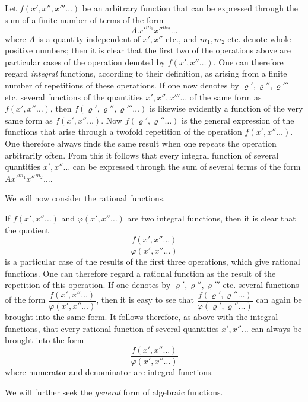 \documentclass{article}
\begin{document}
Let $f(x', x'', x''' \ldots)$ be an arbitrary function that can be expressed through the sum of a finite number of terms of the form
\[ A\,x'^{m_1} x''^{m_2} \ldots \]
where $A$ is a quantity independent of $x', x''$ etc., and $m_1, m_2$ etc. denote whole positive numbers; then it is clear that the first two of the operations above are particular cases of the operation denoted by $f(x', x'' \ldots)$. One can therefore regard \emph{integral} functions, according to their definition, as arising from a finite number of repetitions of these operations. If one now denotes by $\varrho', \varrho'', \varrho''' $ etc. several functions of the quantities $x', x'', x''' \ldots$ of the same form as $f(x', x'' \ldots)$, then $f(\varrho', \varrho'', \varrho''' \ldots)$ is likewise evidently a function of the very same form as $f(x', x'' \ldots)$. Now $f(\varrho', \varrho'' \ldots)$ is the general expression of the functions that arise through a twofold repetition of the operation $f(x', x'' \ldots)$. One therefore always finds the same result when one repeats the operation arbitrarily often. From this it follows that every integral function of several quantities $x', x'' \ldots$ can be expressed through the sum of several terms of the form $A x'^{m_1} x''^{m_2} \ldots$.

We will now consider the rational functions.

If $f(x', x'' \ldots)$ and $\varphi(x', x'' \ldots)$ are two integral functions, then it is clear that the quotient
\[ \frac{f(x', x'' \ldots)}{\varphi(x', x'' \ldots)} \]
is a particular case of the results of the first three operations, which give rational functions. One can therefore regard a rational function as the result of the repetition of this operation. If one denotes by $\varrho', \varrho'', \varrho''' $ etc. several functions of the form $\dfrac{f(x', x'' \ldots)}{\varphi(x', x'' \ldots)}$, then it is easy to see that $\dfrac{f(\varrho', \varrho'' \ldots)}{\varphi(\varrho', \varrho'' \ldots)}$ can again be brought into the same form. It follows therefore, as above with the integral functions, that every rational function of several quantities $x', x'' \ldots$ can always be brought into the form
\[ \frac{f(x', x'' \ldots)}{\varphi(x', x'' \ldots)} \]
where numerator and denominator are integral functions.

We will further seek the \emph{general} form of algebraic functions.
\end{document}
